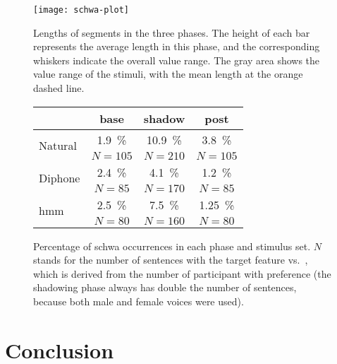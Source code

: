\begin{figure}[t]
	\begin{minipage}{.48\linewidth}
			\centering
			\texttt{[image: schwa-plot]}
			\caption[Lengths of  segments in the three phases]
				{Lengths of  segments in the three phases.
				 The height of each bar represents the average length in this phase, and the corresponding whiskers indicate the overall value range.
				 The gray area shows the value range of the stimuli, with the mean length at the orange dashed line.}
			\label{fig:schwa_conv_bars}
	\end{minipage}
	\hfill
	\begin{minipage}{.49\linewidth}
			\centering
			\captionsetup{type=table}
			\caption[Convergence results for \textipa{[\s{n}]} vs.\ \textipa{[@n]} with three stimuli sets]
				{Percentage of schwa occurrences in each phase and stimulus set.
				 $N$ stands for the number of sentences with the target feature \textipa{[\s{n}]} vs.\ \textipa{[@n]}, which is derived from the number of participant with \textipa{[\s{n}]} preference (the shadowing phase always has double the number of sentences, because both male and female voices were used).}
			\label{tab:schwa_results}
			\begin{tabularx}{\linewidth}{lccc}
				\toprule
				& \textbf{base} & \textbf{shadow} & \textbf{post} \\
				\midrule
				\multirow{2}{1.4cm}{Natural}	& \SI{1.9}{\percent} & \SI{10.9}{\percent} & \SI{3.8}{\percent}  \\\vspace{0.3cm}
											& $ N = 105 $ 		 & $ N = 210 $		   & $ N = 105 $		 \\
				\multirow{2}{1.4cm}{Diphone} 	& \SI{2.4}{\percent} & \SI{4.1}{\percent}  & \SI{1.2}{\percent}  \\\vspace{0.3cm}
											& $ N = 85 $ 		 & $ N = 170 $ 		   & $ N = 85 $			 \\
				\multirow{2}{1.4cm}{\acs{hmm}} 	& \SI{2.5}{\percent} & \SI{7.5}{\percent}  & \SI{1.25}{\percent} \\
											& $ N = 80 $ 		 & $ N = 160 $ 		   & $ N = 80 $			 \\
				\bottomrule
			\end{tabularx}
	\end{minipage}
\end{figure}

\section{Conclusion}
\label{sec:conclusion_shadowing}

